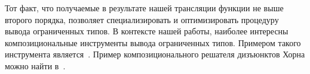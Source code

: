 Тот факт, что получаемые в результате нашей трансляции функции не выше второго порядка, позволяет специализировать и оптимизировать процедуру вывода ограниченных типов. В контексте нашей работы, наиболее интересны композициональные инструменты вывода ограниченных типов. Примером такого инструмента является~\cite{zhu2013compositional}. Пример композиционального решателя дизъюнктов Хорна можно найти в~\cite{komuravelli2016smt}.
